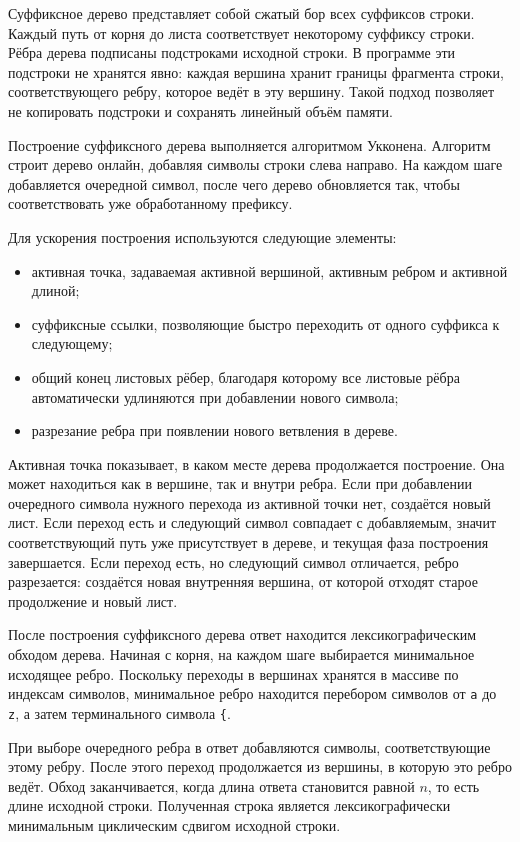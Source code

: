 \documentclass[12pt]{article}
\begin{document}
Суффиксное дерево представляет собой сжатый бор всех суффиксов строки.
Каждый путь от корня до листа соответствует некоторому суффиксу строки.
Рёбра дерева подписаны подстроками исходной строки. В программе эти
подстроки не хранятся явно: каждая вершина хранит границы фрагмента
строки, соответствующего ребру, которое ведёт в эту вершину. Такой подход
позволяет не копировать подстроки и сохранять линейный объём памяти.

Построение суффиксного дерева выполняется алгоритмом Укконена. Алгоритм
строит дерево онлайн, добавляя символы строки слева направо. На каждом
шаге добавляется очередной символ, после чего дерево обновляется так,
чтобы соответствовать уже обработанному префиксу.

Для ускорения построения используются следующие элементы:
\begin{itemize}
	\item активная точка, задаваемая активной вершиной, активным ребром и
	активной длиной;
	\item суффиксные ссылки, позволяющие быстро переходить от одного
	суффикса к следующему;
	\item общий конец листовых рёбер, благодаря которому все листовые
	рёбра автоматически удлиняются при добавлении нового символа;
	\item разрезание ребра при появлении нового ветвления в дереве.
\end{itemize}

Активная точка показывает, в каком месте дерева продолжается построение.
Она может находиться как в вершине, так и внутри ребра. Если при
добавлении очередного символа нужного перехода из активной точки нет,
создаётся новый лист. Если переход есть и следующий символ совпадает с
добавляемым, значит соответствующий путь уже присутствует в дереве, и
текущая фаза построения завершается. Если переход есть, но следующий
символ отличается, ребро разрезается: создаётся новая внутренняя вершина,
от которой отходят старое продолжение и новый лист.

После построения суффиксного дерева ответ находится лексикографическим
обходом дерева. Начиная с корня, на каждом шаге выбирается минимальное
исходящее ребро. Поскольку переходы в вершинах хранятся в массиве по
индексам символов, минимальное ребро находится перебором символов от
\texttt{a} до \texttt{z}, а затем терминального символа \texttt{\{}.

При выборе очередного ребра в ответ добавляются символы, соответствующие
этому ребру. После этого переход продолжается из вершины, в которую это
ребро ведёт. Обход заканчивается, когда длина ответа становится равной
$n$, то есть длине исходной строки. Полученная строка является
лексикографически минимальным циклическим сдвигом исходной строки.
\end{document}
